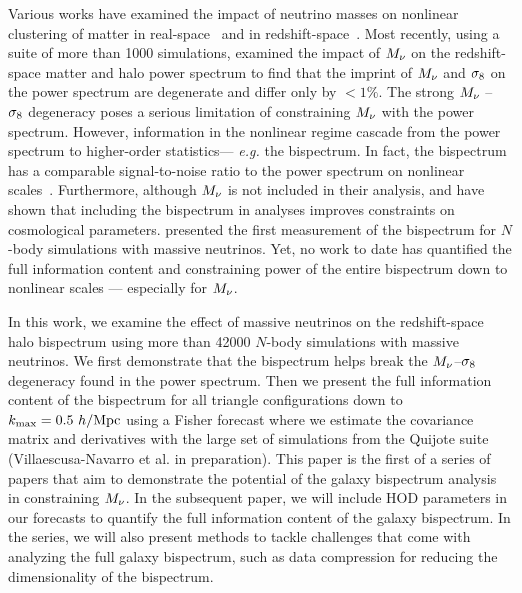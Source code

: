 Various works have examined the impact of neutrino masses on nonlinear clustering 
of matter in 
real-space~\citep[\emph{e.g.}][]{brandbyge2008, saito2008, wong2008, saito2009, viel2010, agarwal2011, bird2012, castorina2015, banerjee2016} 
and in redshift-space~\citep{marulli2011, castorina2015, upadhye2016}. Most recently, 
using a suite of more than 1000 simulations, \cite{villaescusa-navarro2018} 
examined the impact of $M_\nu$ on the redshift-space matter and halo power 
spectrum to find that the imprint of $M_\nu$ and $\sigma_8$ on the power spectrum are 
degenerate and differ only by $< 1\%$. The strong $M_\nu$ -- $\sigma_8$ degeneracy
poses a serious limitation of constraining $M_\nu$ with the power spectrum. 
However, information in the nonlinear regime cascade from the power spectrum 
to higher-order statistics--- \emph{e.g.} the bispectrum. In fact, the 
bispectrum has a comparable signal-to-noise ratio to the power spectrum
on nonlinear scales~\citep{sefusatti2005, chan2017}. Furthermore, although $M_\nu$ 
is not included in their analysis, \cite{sefusatti2006} and \cite{yankelevich2019} 
have shown that including the bispectrum in analyses improves constraints on 
cosmological parameters. \cite{ruggeri2018} presented the first measurement of 
the bispectrum for $N$-body simulations with massive neutrinos. Yet, no work to 
date has quantified the full information content and constraining power of 
the entire bispectrum down to nonlinear scales --- especially for $M_\nu$. 

In this work, we examine the effect of massive neutrinos on the redshift-space 
halo bispectrum using more than 42000 $N$-body simulations with massive neutrinos. 
We first demonstrate that the bispectrum helps break the $M_\nu$--$\sigma_8$ degeneracy 
found in the power spectrum. Then we present the full information content of the 
bispectrum for all triangle configurations down to $k_{\rm max} = 0.5~h/{\rm Mpc}$ using 
a Fisher forecast where we estimate the covariance matrix and derivatives with 
the large set of simulations from the Quijote suite (Villaescusa-Navarro et al. in preparation). 
This paper is the first of a series of papers that aim to demonstrate the potential 
of the galaxy bispectrum analysis in constraining $M_\nu$. In the subsequent paper, 
we will include HOD parameters in our forecasts to quantify the full information 
content of the galaxy bispectrum. In the series, we will also present methods to 
tackle challenges that come with analyzing the full galaxy bispectrum, such as data 
compression for reducing the dimensionality of the bispectrum. 

